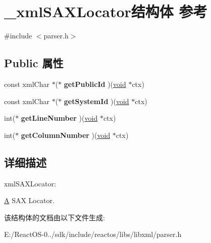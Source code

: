\hypertarget{struct__xml_s_a_x_locator}{}\section{\+\_\+xml\+S\+A\+X\+Locator结构体 参考}
\label{struct__xml_s_a_x_locator}


{\ttfamily \#include $<$parser.\+h$>$}

\subsection*{Public 属性}
\begin{DoxyCompactItemize}
\item 
\mbox{\label{struct__xml_s_a_x_locator_a11597d38dc3f160c83099f1ec271c423}} 
const xml\+Char $\ast$($\ast$ {\bfseries get\+Public\+Id} )(\hyperlink{interfacevoid}{void} $\ast$ctx)
\item 
\mbox{\label{struct__xml_s_a_x_locator_a1e0593c3737ab0b589fef883852d61ba}} 
const xml\+Char $\ast$($\ast$ {\bfseries get\+System\+Id} )(\hyperlink{interfacevoid}{void} $\ast$ctx)
\item 
\mbox{\label{struct__xml_s_a_x_locator_a8a2688e388ab72c211e0a27e54d2e0c3}} 
int($\ast$ {\bfseries get\+Line\+Number} )(\hyperlink{interfacevoid}{void} $\ast$ctx)
\item 
\mbox{\label{struct__xml_s_a_x_locator_a3d0cf862955861acdee6da5280b1284d}} 
int($\ast$ {\bfseries get\+Column\+Number} )(\hyperlink{interfacevoid}{void} $\ast$ctx)
\end{DoxyCompactItemize}


\subsection{详细描述}
xml\+S\+A\+X\+Locator\+:

\hyperlink{struct_a}{A} S\+AX Locator. 

该结构体的文档由以下文件生成\+:\begin{DoxyCompactItemize}
\item 
E\+:/\+React\+O\+S-\/0../sdk/include/reactos/libs/libxml/parser.\+h\end{DoxyCompactItemize}

